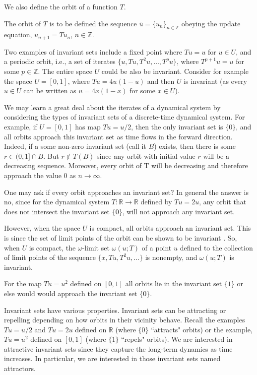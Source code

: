We also define the orbit of a function $T$.
\begin{Definition}
  [\bf Orbit of $T$]\label{Dfn_Orbit}\rm
  The orbit of $T$ is to be defined the sequence $\bar{u} = \{u_n\}_{n\in \mathbb{Z}}$ obeying the update equation, $u_{n+1}=Tu_n$, $n \in \mathbb{Z}$. 
\end{Definition}

Two examples of invariant sets include a fixed point where $Tu=u$ for  $u\in U$, and a periodic orbit, i.e., a set of iterates $\{u,Tu, T^2u,\ldots,T^pu\}$, where $T^{p+1}u=u$ for some $p\in\mathbb{Z}$.  The entire space $U$ could be also be invariant.
Consider for example the space $U=[0,1]$, where $Tu=4u(1-u)$ and then $U$ is invariant (as every $u\in{U}$ can be written as $u = 4x(1-x)$ for some $x\in{U}$).

We may learn a great deal about the iterates of a dynamical system by considering the types of invariant sets of a discrete-time dynamical system.  For example, if $U=[0,1]$ has map $Tu= u/2$, then the only invariant set is $\{0\}$, and all orbits approach this invariant set as time flows in the forward direction. 
Indeed, if a some non-zero invariant set (call it $B$) exists, then there is  some $r\in(0,1]\cap{B}$. But $r\notin{T(B)}$ since any orbit with initial value $r$ will be a decreasing sequence. Moreover, every orbit of T will be decreasing and therefore approach the value $0$ as $n\rightarrow\infty$.

One may ask if every orbit approaches an invariant set? In general the answer is no, since for the dynamical system $T: \mathbb{R} \to \mathbb{R}$ defined by $Tu=2u$, any orbit that does not intersect the invariant set $\{0\}$, will not approach any invariant set. 

However,  when the space $U$ is compact, all orbits approach an invariant set. This is since the set of limit points of the orbit can be shown to be invariant \cite{de2013elements}. So, when $U$ is compact,  the $\omega$-limit set $\omega(u;T)$ of a point $u$ defined to the collection of limit points of the sequence $\{x,Tu,T^2u,\ldots\}$ is nonempty, and $\omega(u;T)$ is invariant. 

\begin{Example}
  For the map $Tu=u^2$ defined on $[0,1]$ all orbits lie in the invariant set $\{1\}$ or else would would approach the invariant set $\{0\}$. 
\end{Example}


Invariant sets have various properties. Invariant sets can be attracting or repelling depending on how orbits in their vicinity behave. 
Recall the examples $Tu =u/2$ and $Tu=2u$ defined on $\mathbb{R}$ (where $\{0\}$ “attracts" orbits) or the example, $Tu=u^2$ defined on $[0,1]$ (where $\{1\}$ “repels" orbits). 
We are interested in attractive invariant sets since they capture the long-term dynamics as time increases. 
In particular, we are interested in those invariant sets named attractors.

